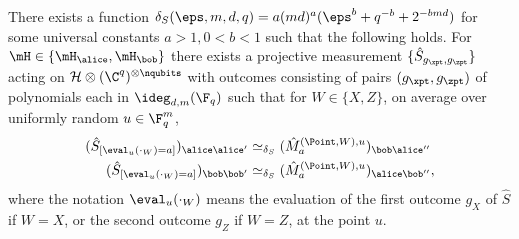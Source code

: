 \begin{lemma}\label{lem:qld-4-7}
There exists a function $\delta_S(\eps,m,d,q) = a(md)^a (\eps^b + q^{-b} + 2^{-bmd})$ for some universal constants $a > 1, 0 < b < 1$ such that the following holds. For $\mH \in \{\mH_\alice,\mH_\bob\}$ there exists a projective measurement $\{ \hat{S}_{g_\xpt,g_\zpt} \}$ acting on $\mathcal{H} \otimes (\C^q)^{\otimes \nqubits}$ with outcomes consisting of pairs $(g_\xpt,g_\zpt)$ of polynomials each in $\ideg_{d,m}(\F_q)$ such that for $W \in \{X,Z\}$, on average over uniformly random $u \in \F_q^m$,
\begin{align}
  (\hat{S}_{[\eval_{u}(\cdot_{W}) = a]})_{\alice \alice'} &\simeq_{\delta_S} (\hat{M}^{(\Point, W), u}_{a})_{\bob \alice''} \label{eq:qld-s-point-con-alice} \\ 
    (\hat{S}_{[\eval_{u}(\cdot_{W}) = a]})_{\bob \bob'} &\simeq_{\delta_S} (\hat{M}^{(\Point, W), u}_{a})_{\alice \bob''} \label{eq:qld-s-point-con-bob},
\end{align}
where the notation $\eval_{u}(\cdot_W)$ means the evaluation of the first outcome $g_X$ of $\hat{S}$ if $W = X$, or the second outcome $g_Z$ if $W = Z$, at the point $u$.
\end{lemma}


